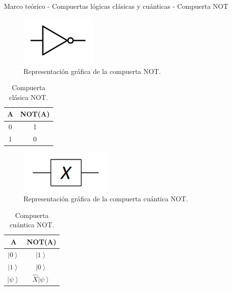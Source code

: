\begin{frame}{Marco teórico - Compuertas lógicas clásicas y cuánticas - Compuerta NOT}
\vspace{0.5cm}
 \begin{minipage}{0.49\linewidth}
    \begin{figure}[H]
        \centering
        \includegraphics[height=2.5cm]{images/not.png}
        \caption{Representación gráfica de la compuerta NOT.}
    \end{figure}
    \begin{table}[H]
        \centering
        \begin{tabular}{cc} \hline
            A & NOT(A)\\ \hline
            0 & 1 \\
            1 & 0 \\ \hline
        \end{tabular}
        \caption{Compuerta clásica NOT.}
    \end{table}
\end{minipage}
\begin{minipage}{0.49\linewidth}
    \begin{figure}[H]
        \centering
        \includegraphics[height=2.1cm]{images/not_c.png}
        \caption{Representación gráfica de la compuerta cuántica NOT.}
    \end{figure}
    \begin{table}[H]
        \centering
        \begin{tabular}{cc} \hline
            A & NOT(A) \\ \hline
            $\left| 0 \right\rangle$ & $\left| 1 \right\rangle$ \\
            $\left| 1\right\rangle$ & $\left| 0 \right\rangle$ \\
            $\left| \psi \right\rangle$ & $\hat{X}\left| \psi \right\rangle$ \\ \hline
        \end{tabular}
        \caption{Compuerta cuántica NOT.}
    \end{table}
\end{minipage} 
\end{frame}
